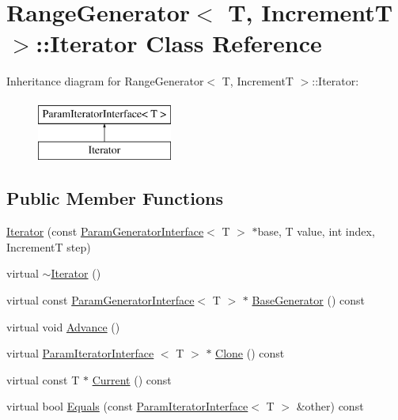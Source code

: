 \hypertarget{classtesting_1_1internal_1_1RangeGenerator_1_1Iterator}{\section{\-Range\-Generator$<$ \-T, \-Increment\-T $>$\-:\-:\-Iterator \-Class \-Reference}
\label{d5/dfa/classtesting_1_1internal_1_1RangeGenerator_1_1Iterator}
}
\-Inheritance diagram for \-Range\-Generator$<$ \-T, \-Increment\-T $>$\-:\-:\-Iterator\-:\begin{figure}[H]
\begin{center}
\leavevmode
\includegraphics[height=2.000000cm]{d5/dfa/classtesting_1_1internal_1_1RangeGenerator_1_1Iterator}
\end{center}
\end{figure}
\subsection*{\-Public \-Member \-Functions}
\begin{DoxyCompactItemize}
\item 
\hyperlink{classtesting_1_1internal_1_1RangeGenerator_1_1Iterator_a853cc6516bfe7f8c4fd82e3466ab3007}{\-Iterator} (const \hyperlink{classtesting_1_1internal_1_1ParamGeneratorInterface}{\-Param\-Generator\-Interface}$<$ \-T $>$ $\ast$base, \-T value, int index, \-Increment\-T step)
\item 
virtual \hyperlink{classtesting_1_1internal_1_1RangeGenerator_1_1Iterator_a47b331bac1d130f2bab2c40e76ccb54a}{$\sim$\-Iterator} ()
\item 
virtual const \*
\hyperlink{classtesting_1_1internal_1_1ParamGeneratorInterface}{\-Param\-Generator\-Interface}$<$ \-T $>$ $\ast$ \hyperlink{classtesting_1_1internal_1_1RangeGenerator_1_1Iterator_a150e3ccaeb07362b8d88a94fecd4a6b6}{\-Base\-Generator} () const 
\item 
virtual void \hyperlink{classtesting_1_1internal_1_1RangeGenerator_1_1Iterator_aaa5a890708f89affa1a7726cf152c872}{\-Advance} ()
\item 
virtual \hyperlink{classtesting_1_1internal_1_1ParamIteratorInterface}{\-Param\-Iterator\-Interface}\*
$<$ \-T $>$ $\ast$ \hyperlink{classtesting_1_1internal_1_1RangeGenerator_1_1Iterator_a68b8ee0444cdc7c84f4a82e910e66893}{\-Clone} () const 
\item 
virtual const \-T $\ast$ \hyperlink{classtesting_1_1internal_1_1RangeGenerator_1_1Iterator_a11285bd5236d32bdacd8fbeb6ecfa4c4}{\-Current} () const 
\item 
virtual bool \hyperlink{classtesting_1_1internal_1_1RangeGenerator_1_1Iterator_af9c7ebdba09d6bd866f0967359e02ad8}{\-Equals} (const \hyperlink{classtesting_1_1internal_1_1ParamIteratorInterface}{\-Param\-Iterator\-Interface}$<$ \-T $>$ \&other) const 
\end{DoxyCompactItemize}

